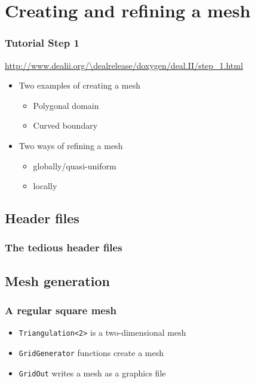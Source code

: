 
\section[Mesh]{Creating and refining a mesh}

\begin{frame}
  \frametitle{Tutorial Step 1}
  {\footnotesize{\url{http://www.dealii.org/\dealrelease/doxygen/deal.II/step_1.html}}}
  \begin{itemize}
  \item Two examples of creating a mesh
    \begin{itemize}
    \item Polygonal domain
    \item Curved boundary
    \end{itemize}
  \item Two ways of refining a mesh
    \begin{itemize}
    \item globally/quasi-uniform
    \item locally
    \end{itemize}
  \end{itemize}
\end{frame}

\subsection{Header files}
\begin{frame}
  \frametitle{The tedious header files}
  \begin{block}{}
      
  \end{block}
\end{frame}

\subsection{Mesh generation}
\begin{frame}
  \frametitle{A regular square mesh}
  \begin{block}{}
        
  \end{block}

  \begin{itemize}
  \item \lstinline!Triangulation<2>! is a two-dimensional mesh
  \item \lstinline!GridGenerator! functions create a mesh
  \item \lstinline!GridOut! writes a mesh as a graphics file
  \end{itemize}
\end{frame}

